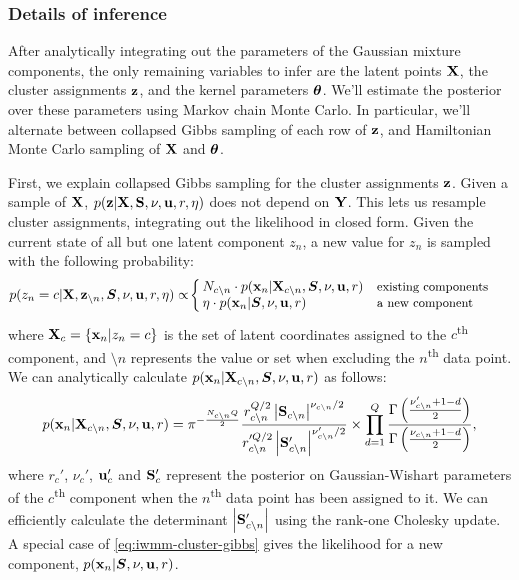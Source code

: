 \subsubsection{Details of inference}
\label{sec:iwmm-inference-details}

After analytically integrating out the parameters of the Gaussian mixture components, the only remaining variables to infer are the latent points $\mathbf{X}$, the cluster assignments ${\bf{z}}$, and the kernel parameters ${\boldsymbol{\theta}}$.
We'll estimate the posterior over these parameters using Markov chain Monte Carlo.
In particular, we'll alternate between collapsed Gibbs sampling of each row of ${\bf{z}}$, and Hamiltonian Monte Carlo sampling of $\mathbf{X}$ and ${\boldsymbol{\theta}}$.

First, we explain collapsed Gibbs sampling for the cluster assignments ${\bf{z}}$.
Given a sample of $\mathbf{X}$, $p({\bf{z}} | \mathbf{X}, \mathbf{S}, \nu, {\bf{u}}, r, \eta)$ does not depend on $\mathbf{Y}$.
This lets us resample cluster assignments, integrating out the \iGMM{} likelihood in closed form.
Given the current state of all but one latent component $z_n$, a new value for $z_n$ is sampled with the following probability:
%
\begin{align}
p(z_{n}=c|\mathbf{X},{\bf{z}}_{\setminus n},\bm{S},\nu,{\bf{u}},r,\eta)
 & \propto\!
\left\{
\begin{array}{ll}
\!\!N_{c\setminus n}\cdot p({\bf{x}}_{n}|\mathbf{X}_{c\setminus n},\bm{S},\nu,{\bf{u}},r) & \text{{\small existing components}}\\
\!\!\eta\cdot p({\bf{x}}_{n}|\bm{S},\nu,{\bf{u}},r) & \text{{\small a new component}}
\end{array}
\right.
\label{eq:gibbs}
\end{align}
%
where
$\mathbf{X}_{c}=\{{\bf{x}}_{n}|z_{n}=c\}$
is the set of latent coordinates assigned to the $c$\textsuperscript{th} component,
and $\setminus n$ represents the value or set when excluding the $n$\textsuperscript{th} data point.
We can analytically calculate $p({\bf{x}}_{n}|\mathbf{X}_{c\setminus n},\bm{S},\nu,{\bf{u}},r)$
as follows:
%
\begin{align}
p({\bf{x}}_{n}|\mathbf{X}_{c\setminus n},\bm{S},\nu,{\bf{u}},r)
=\pi^{-\frac{N_{c\setminus n}Q}{2}}
\frac{r_{c\setminus n} ^{Q/2} \left| \mathbf{S}_{c\setminus n}  \right|^{\nu_{c\setminus n}/2}}
     {r_{c\setminus n}'^{Q/2} \left| \mathbf{S}_{c\setminus n}' \right|^{\nu_{c\setminus n}'/2}}
\times \prod_{d=1}^{Q}
\frac{\Gamma \left( \frac{\nu_{c\setminus n}' + 1 - d}{2} \right)}
     {\Gamma \left( \frac{\nu_{c\setminus n}  + 1 - d}{2} \right)},
\label{eq:iwmm-cluster-gibbs}
\end{align}
%
where $r_{c}'$, $\nu_{c}'$, ${\bf{u}}_{c}'$ and $\mathbf{S}_{c}'$ represent the posterior on Gaussian-Wishart parameters of the $c$\textsuperscript{th} component when the $n$\textsuperscript{th} data point has been assigned to it.
We can efficiently calculate the determinant $\left| \mathbf{S}_{c\setminus n}' \right|$ using the rank-one Cholesky update.
A special case of \cref{eq:iwmm-cluster-gibbs} gives the likelihood for a new component, $p({\bf{x}}_{n}|\bm{S},\nu,{\bf{u}},r)$.



